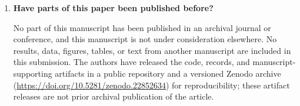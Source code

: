 \documentclass[10pt]{article}
\begin{document}
\begin{enumerate}
\item \textbf{Have parts of this paper been published before?}

No part of this manuscript has been published in an archival journal or
conference, and this manuscript is not under consideration elsewhere. No
results, data, figures, tables, or text from another manuscript are included in
this submission. The authors have released the code, records, and
manuscript-supporting artifacts in a public repository and a versioned Zenodo archive
(\url{https://doi.org/10.5281/zenodo.22852634}) for reproducibility; these
artifact releases are not prior archival publication of the article.
\end{enumerate}
\end{document}
